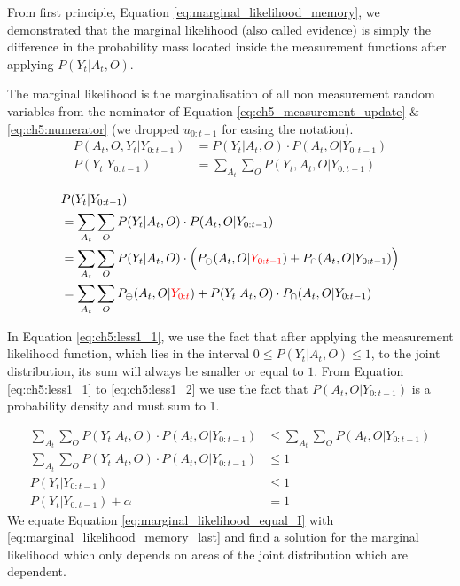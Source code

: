 From first principle, Equation \ref{eq:marginal_likelihood_memory}, we demonstrated that the marginal likelihood (also called evidence) is simply the difference
in the probability mass located inside the measurement functions after applying $P(Y_t|A_t,O)$.

The marginal likelihood is the marginalisation of all non measurement random variables from 
the nominator of Equation \ref{eq:ch5_measurement_update} \& \ref{eq:ch5:numerator} (we dropped $u_{0:t-1}$ for easing the notation).
\begin{align}\label{eq:ch5:numerator}
  P(A_t,O,Y_t|Y_{0:t-1}) &= P(Y_t|A_t,O) \cdot P(A_t,O|Y_{0:t-1})\\ 
 P(Y_t|Y_{0:t-1}) &= \sum\limits_{A_t}\sum\limits_{O} P(Y_t,A_t,O|Y_{0:t-1})  \label{eq:marginal_likelihood_memory}  
\end{align}
 
\begin{align}
 &P(Y_t|Y_{0:t-1}) \\ 
		  &= \sum\limits_{A_t}\sum\limits_{O} P(Y_t|A_t,O)\cdot P(A_t,O|Y_{0:t-1}) \\
		  &= \sum\limits_{A_t}\sum\limits_{O} P(Y_t|A_t,O)\cdot \Big(P_{\ominus}(A_t,O|{\color{red}Y_{0:t-1}}) + P_{\cap}(A_t,O|Y_{0:t-1})\Big)\\
		  &= \sum\limits_{A_t}\sum\limits_{O} P_{\ominus}(A_t,O|{\color{red}Y_{0:t}}) + P(Y_t|A_t,O)\cdot P_{\cap}(A_t,O|Y_{0:t-1}) \label{eq:marginal_likelihood_memory_last}
\end{align}

In Equation \ref{eq:ch5:less1_1}, we use the fact that after applying the measurement likelihood function, which lies in the interval $0 \leq P(Y_t|A_t,O) \leq 1$, 
to the joint distribution, its sum will always be smaller or equal to $1$.
From Equation \ref{eq:ch5:less1_1} to \ref{eq:ch5:less1_2} we use the fact that $P(A_t,O|Y_{0:t-1})$ is a probability density and must sum to 1.

\begin{align}
  \sum\limits_{A_t}\sum\limits_{O} P(Y_t|A_t,O) \cdot P(A_t,O|Y_{0:t-1})  &\leq \sum\limits_{A_t}\sum\limits_{O} P(A_t,O|Y_{0:t-1}) \label{eq:ch5:less1_1}\\
  \sum\limits_{A_t}\sum\limits_{O} P(Y_t|A_t,O) \cdot P(A_t,O|Y_{0:t-1}) &\leq 1 \label{eq:ch5:less1_2} \\
  P(Y_t|Y_{0:t-1}) &\leq 1 \\
  P(Y_t|Y_{0:t-1}) + \alpha &= 1 \label{eq:marginal_likelihood_equal_I}
\end{align}
We equate Equation \ref{eq:marginal_likelihood_equal_I} with \ref{eq:marginal_likelihood_memory_last} and find a solution for the marginal likelihood which
only depends on areas of the joint distribution which are dependent.
		   
